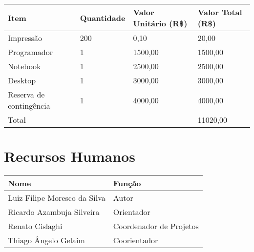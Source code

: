     \begin{tabular}{l l l l}

        \hline

        Item                    &   Quantidade  &   Valor Unitário (R\$)    &   Valor Total (R\$) \\

        \hline

        Impressão               &   200         &   0,10                    &   20,00             \\

        Programador             &   1           &   1500,00                 &   1500,00           \\
        Notebook                &   1           &   2500,00                 &   2500,00           \\
        Desktop                 &   1           &   3000,00                 &   3000,00           \\
        Reserva de contingência &   1           &   4000,00                 &   4000,00           \\

        \hline

        Total                   &               &                           &   11020,00

    \end{tabular}



\section{Recursos Humanos}
    \begin{tabular}{l l}
        \hline
        Nome                            & Função                  \\
        \hline
        Luiz Filipe Moresco da Silva    & Autor                   \\
        Ricardo Azambuja Silveira       & Orientador              \\
        Renato Cislaghi                 & Coordenador de Projetos \\
        Thiago Ângelo Gelaim            & Coorientador            \\
        \hline
    \end{tabular}
    \\




